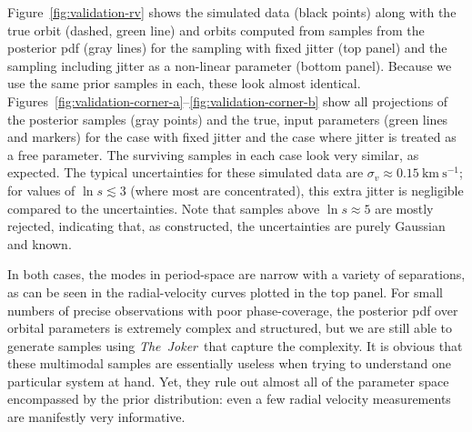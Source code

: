 \documentclass[manuscript, letterpaper]{aastex6}
\newcommand{\project}[1]{\textsl{#1}}
\newcommand{\samplername}{\project{The~Joker}}
\newcommand{\figname}{Figure}
\newcommand{\kms}{\mathrm{km}~\mathrm{s}^{-1}}
\begin{document}
\figname~\ref{fig:validation-rv} shows the simulated data (black points) along with
the true orbit (dashed, green line) and orbits computed from samples from the
posterior pdf (gray lines) for the sampling with fixed jitter (top panel) and
the sampling including jitter as a non-linear parameter (bottom panel).
Because we use the same prior samples in each, these look almost identical.
\figname s~\ref{fig:validation-corner-a}--\ref{fig:validation-corner-b} show all
projections of the posterior samples (gray points) and the true, input
parameters (green lines and markers) for the case with fixed jitter and the case
where jitter is treated as a free parameter.
The surviving samples in each case look very similar, as expected.
The typical uncertainties for these simulated data are $\sigma_v \approx
0.15~\kms$; for values of $\ln s \lesssim 3$ (where most are concentrated), this
extra jitter is negligible compared to the uncertainties.
Note that samples above $\ln s \approx 5$ are mostly rejected, indicating that,
as constructed, the uncertainties are purely Gaussian and known.

In both cases, the modes in period-space are narrow with a variety of
separations, as can be seen in the radial-velocity curves plotted in the top
panel.
For small numbers of precise observations with poor phase-coverage, the
posterior pdf over orbital parameters is extremely complex and structured, but
we are still able to generate samples using \samplername\ that capture the
complexity.
It is obvious that these multimodal samples are essentially useless when
trying to understand one particular system at hand. Yet, they rule out almost
all of the parameter space encompassed by the prior distribution:
even a few radial velocity measurements are manifestly very informative.
\end{document}

